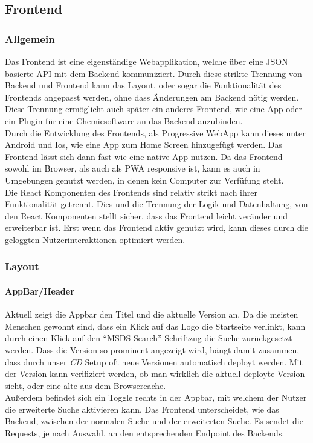 \documentclass[oneside, a4paper, 12pt, titlepage]{article}
\begin{document}
\subsection{Frontend}
\subsubsection{Allgemein}
Das Frontend ist eine eigenständige Webapplikation, welche über eine JSON basierte API mit dem Backend kommuniziert. Durch diese strikte Trennung von Backend und Frontend kann das Layout, oder sogar die Funktionalität des Frontends angepasst werden, ohne dass Änderungen am Backend nötig werden. Diese Trennung ermöglicht auch später ein anderes Frontend, wie eine App oder ein Plugin für eine Chemiesoftware an das Backend anzubinden.\\
Durch die Entwicklung des Frontends, als Progressive WebApp kann dieses unter Android und Ios, wie eine App zum Home Screen hinzugefügt werden. Das Frontend lässt sich dann fast wie eine native App nutzen. Da das Frontend sowohl im Browser, als auch als PWA responsive ist, kann es auch in Umgebungen genutzt werden, in denen kein Computer zur Verfüfung steht.\\
Die React Komponenten des Frontends sind relativ strikt nach ihrer Funktionalität getrennt. Dies und die Trennung der Logik und Datenhaltung, von den React Komponenten stellt sicher, dass das Frontend leicht veränder und erweiterbar ist. Erst wenn das Frontend aktiv genutzt wird, kann dieses durch die geloggten Nutzerinteraktionen optimiert werden.

\subsubsection{Layout}

\paragraph{AppBar/Header}
Aktuell zeigt die Appbar den Titel und die aktuelle Version an. Da die meisten Menschen gewohnt sind, dass ein Klick auf das Logo die Startseite verlinkt, kann durch einen Klick auf den ``MSDS Search'' Schriftzug die Suche zurückgesetzt werden. Dass die Version so prominent angezeigt wird, hängt damit zusammen, dass durch unser \textit{CD} Setup oft neue Versionen automatisch deployt werden. Mit der Version kann verifiziert werden, ob man wirklich die aktuell deployte Version sieht, oder eine alte aus dem Browsercache.\\
Außerdem befindet sich ein Toggle rechts in der Appbar, mit welchem der Nutzer die erweiterte Suche aktivieren kann. Das Frontend unterscheidet, wie das Backend, zwischen der normalen Suche und der erweiterten Suche. Es sendet die Requests, je nach Auswahl, an den entsprechenden Endpoint des Backends.
\end{document}
